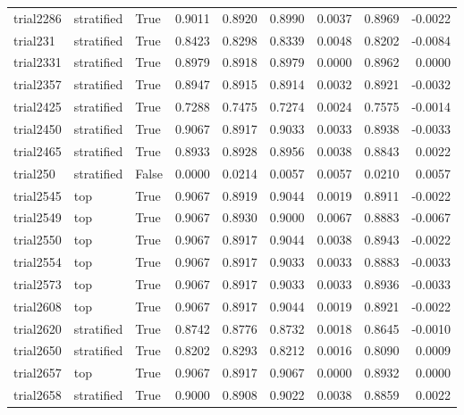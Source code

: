 \begin{tabular}{lllrrrrrr}
trial2286 & stratified &         True &  0.9011 &     0.8920 &  0.8990 &     0.0037 &   0.8969 &   -0.0022 \\
 trial231 & stratified &         True &  0.8423 &     0.8298 &  0.8339 &     0.0048 &   0.8202 &   -0.0084 \\
trial2331 & stratified &         True &  0.8979 &     0.8918 &  0.8979 &     0.0000 &   0.8962 &    0.0000 \\
trial2357 & stratified &         True &  0.8947 &     0.8915 &  0.8914 &     0.0032 &   0.8921 &   -0.0032 \\
trial2425 & stratified &         True &  0.7288 &     0.7475 &  0.7274 &     0.0024 &   0.7575 &   -0.0014 \\
trial2450 & stratified &         True &  0.9067 &     0.8917 &  0.9033 &     0.0033 &   0.8938 &   -0.0033 \\
trial2465 & stratified &         True &  0.8933 &     0.8928 &  0.8956 &     0.0038 &   0.8843 &    0.0022 \\
 trial250 & stratified &        False &  0.0000 &     0.0214 &  0.0057 &     0.0057 &   0.0210 &    0.0057 \\
trial2545 &        top &         True &  0.9067 &     0.8919 &  0.9044 &     0.0019 &   0.8911 &   -0.0022 \\
trial2549 &        top &         True &  0.9067 &     0.8930 &  0.9000 &     0.0067 &   0.8883 &   -0.0067 \\
trial2550 &        top &         True &  0.9067 &     0.8917 &  0.9044 &     0.0038 &   0.8943 &   -0.0022 \\
trial2554 &        top &         True &  0.9067 &     0.8917 &  0.9033 &     0.0033 &   0.8883 &   -0.0033 \\
trial2573 &        top &         True &  0.9067 &     0.8917 &  0.9033 &     0.0033 &   0.8936 &   -0.0033 \\
trial2608 &        top &         True &  0.9067 &     0.8917 &  0.9044 &     0.0019 &   0.8921 &   -0.0022 \\
trial2620 & stratified &         True &  0.8742 &     0.8776 &  0.8732 &     0.0018 &   0.8645 &   -0.0010 \\
trial2650 & stratified &         True &  0.8202 &     0.8293 &  0.8212 &     0.0016 &   0.8090 &    0.0009 \\
trial2657 &        top &         True &  0.9067 &     0.8917 &  0.9067 &     0.0000 &   0.8932 &    0.0000 \\
trial2658 & stratified &         True &  0.9000 &     0.8908 &  0.9022 &     0.0038 &   0.8859 &    0.0022 \\

\end{tabular}
